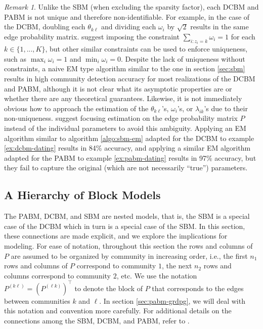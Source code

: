\documentclass[
  12pt,
]{article}
\theoremstyle{definition}
\theoremstyle{definition}
\theoremstyle{definition}
\theoremstyle{definition}
\theoremstyle{remark}
\newtheorem*{remark}{Remark}
\begin{document}
\begin{remark}
Unlike the SBM (when excluding the sparsity factor), each DCBM and PABM is not unique and therefore non-identifiable. 
For example, in the case of the DCBM, doubling each $\theta_{k \ell}$ and dividing each $\omega_i$ by $\sqrt{2}$ results in the same edge probability matrix. 
\citet{Karrer_2011} suggest imposing the constraint $\sum_{i : z_i = k} \omega_i = 1$ for each $k \in \{1, ..., K\}$, but other similar constraints can be used to enforce uniqueness, such as $\max_i \omega_i = 1$ and $\min_i \omega_i = 0$. 
Despite the lack of uniqueness without constraints, a naive EM type algorithm similar to the one in section \ref{sec:sbm} results in high community detection accuracy for most realizations of the DCBM and PABM, although it is not clear what its asymptotic properties are or whether there are any theoretical guarantees. 
Likewise, it is not immediately obvious how to approach the estimation of the $\theta_{k \ell}$'s, $\omega_i$'s, or $\lambda_{ik}$'s due to their non-uniqueness. 
\citet{noroozi2019estimation} suggest focusing estimation on the edge probability matrix $P$ instead of the individual parameters to avoid this ambiguity. 
Applying an EM algorithm similar to algorithm \ref{algo:sbm-em} adapted for the DCBM to example \ref{ex:dcbm-dating} results in 84\% accuracy, and applying a similar EM algorithm adapted for the PABM to example \ref{ex:pabm-dating} results in 97\% accuracy, but they fail to capture the original (which are not necessarily ``true'') parameters. 
\end{remark}

\hypertarget{sec:hierarchy}{%
\subsection{A Hierarchy of Block Models}\label{sec:hierarchy}}

The PABM, DCBM, and SBM are nested models, that is, the SBM is a special case of the DCBM which in turn is a special case of the SBM.
In this section, these connections are made explicit, and we explore the implications for modeling.
For ease of notation, throughout this section the rows and columns of \(P\) are assumed to be organized by community in increasing order, i.e., the first \(n_1\) rows and columns of \(P\) correspond to community \(1\), the next \(n_2\) rows and columns correspond to community \(2\), etc.
We use the notation \(P^{(k \ell)} = (P^{(\ell k)})^\top\) to denote the block of \(P\) that corresponds to the edges between communities \(k\) and \(\ell\).
In section \ref{sec:pabm-grdpg}, we will deal with this notation and convention more carefully.
For additional details on the connections among the SBM, DCBM, and PABM, refer to \citet{Noroozi2022}.
\end{document}
